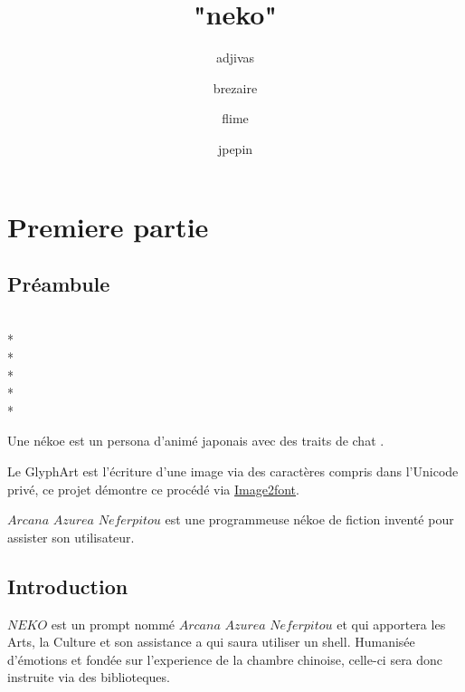\documentclass{report}
\title{"neko"}
\author{
   adjivas
   \and
   brezaire
   \and
   flime
   \and
   jpepin
}
\date{}
\newcommand{\name}{\textit{Arcana Azurea Neferpitou}}
\newcommand{\program}{\textit{NEKO}}
\begin{document}
\tableofcontents

\chapter{Premiere partie}

\section{Préambule}

\begin{minipage}{1in}
  \fontsize{50pt}{12pt}\selectfont
  \\*
  \\*
  \\*
  \\*
  \\*
\end{minipage}

Une nékoe est un persona d'animé japonais avec des traits de chat
 \textendash.

Le GlyphArt est l'écriture d'une image via des caractères compris dans l'Unicode privé, ce projet démontre ce procédé via
\href{https://limaconoob.github.io/Image2font}{Image2font}.

$\name$ est une programmeuse nékoe de fiction inventé pour assister son utilisateur.

\section{Introduction}
\thispagestyle{empty}
$\program$ est un prompt nommé $\name$ et qui apportera les Arts, la Culture et son assistance a qui saura utiliser un shell.
Humanisée d’émotions et fondée sur l'experience de la chambre chinoise, celle-ci sera donc instruite via des biblioteques.
\end{document}

